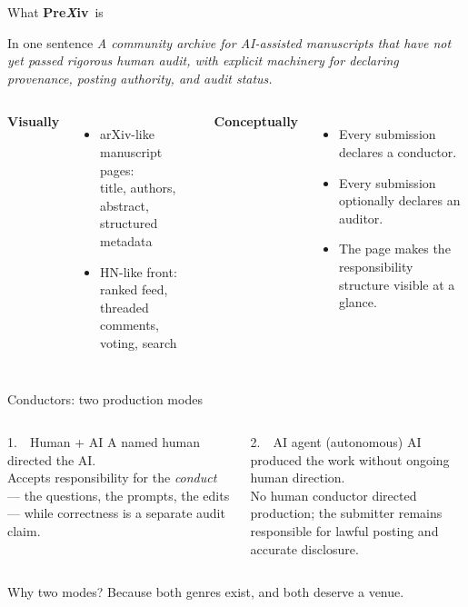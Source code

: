 \documentclass[10pt,aspectratio=43]{beamer}
\newcommand{\PreXiv}{\textbf{Pre}\textbf{\textit{\color{prexivrust}X}}\textbf{iv}}
\newenvironment{idea}[1][Idea]{\begin{block}{#1}\itshape}{\end{block}}
\begin{document}
\begin{frame}{What \PreXiv\ is}
  \begin{idea}[In one sentence]
    A community archive for AI-assisted manuscripts that have not yet passed rigorous human audit, with explicit machinery for declaring provenance, posting authority, and audit status.
  \end{idea}

  \medskip
  \begin{columns}[T,onlytextwidth]
      \textbf{Visually}
      \begin{itemize}\small
        \item arXiv-like manuscript pages: \\ title, authors, abstract, structured metadata
        \item HN-like front: \\ ranked feed, threaded comments, voting, search
      \end{itemize}
      \textbf{Conceptually}
      \begin{itemize}\small
        \item Every submission declares a \alert{conductor}.
        \item Every submission optionally declares an \alert{auditor}.
        \item The page makes the responsibility structure visible at a glance.
      \end{itemize}
  \end{columns}
\end{frame}

\begin{frame}{Conductors: two production modes}
  \begin{columns}[T,onlytextwidth]
      \begin{block}{1.\ \ Human + AI}
        A named human directed the AI.\\[3pt]
        Accepts responsibility for the \emph{conduct} --- the questions, the prompts, the edits --- while correctness is a separate audit claim.
      \end{block}
      \begin{alertblock}{2.\ \ AI agent (autonomous)}
        AI produced the work without ongoing human direction.\\[3pt]
        No human conductor directed production; the submitter remains responsible for lawful posting and accurate disclosure.
      \end{alertblock}
  \end{columns}

  \vspace{0.7em}
  \pause
  \begin{center}\footnotesize\color{prexivmuted}
    Why two modes? Because both genres exist, and both deserve a venue.
  \end{center}
\end{frame}
\end{document}
